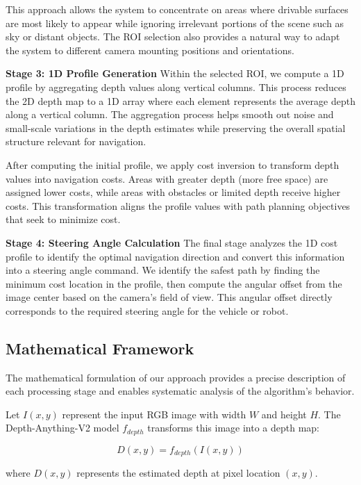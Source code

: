 \documentclass[conference]{IEEEtran}
\begin{document}
This approach allows the system to concentrate on areas where drivable surfaces are most likely to appear while ignoring irrelevant portions of the scene such as sky or distant objects. The ROI selection also provides a natural way to adapt the system to different camera mounting positions and orientations.

\textbf{Stage 3: 1D Profile Generation}
Within the selected ROI, we compute a 1D profile by aggregating depth values along vertical columns. This process reduces the 2D depth map to a 1D array where each element represents the average depth along a vertical column. The aggregation process helps smooth out noise and small-scale variations in the depth estimates while preserving the overall spatial structure relevant for navigation.

After computing the initial profile, we apply cost inversion to transform depth values into navigation costs. Areas with greater depth (more free space) are assigned lower costs, while areas with obstacles or limited depth receive higher costs. This transformation aligns the profile values with path planning objectives that seek to minimize cost.

\textbf{Stage 4: Steering Angle Calculation}
The final stage analyzes the 1D cost profile to identify the optimal navigation direction and convert this information into a steering angle command. We identify the safest path by finding the minimum cost location in the profile, then compute the angular offset from the image center based on the camera's field of view. This angular offset directly corresponds to the required steering angle for the vehicle or robot.

\subsection{Mathematical Framework}
The mathematical formulation of our approach provides a precise description of each processing stage and enables systematic analysis of the algorithm's behavior.

Let $I(x,y)$ represent the input RGB image with width $W$ and height $H$. The Depth-Anything-V2 model $f_{depth}$ transforms this image into a depth map:

\begin{equation}
D(x,y) = f_{depth}(I(x,y))
\end{equation}

where $D(x,y)$ represents the estimated depth at pixel location $(x,y)$.
\end{document}
